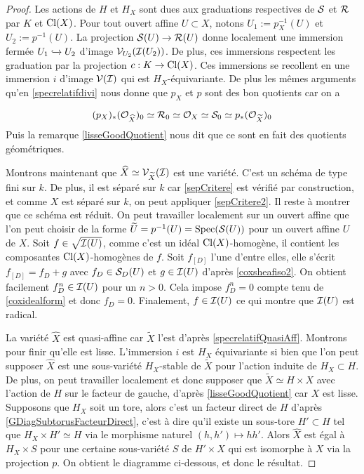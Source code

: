 \begin{proof}
Les actions de $H$ et $H_X$ sont dues aux graduations respectives de $\mathcal{S}$ et $\mathcal{R}$ par $K$ et $\operatorname{Cl}(X)$. Pour tout ouvert affine $U\subset X$, notons $U_1:=p_X^{-1}(U)$ et $U_2:=p^{-1}(U)$. La projection $\mathcal{S}(U)\rightarrow \mathcal{R}(U)$ donne localement une immersion fermée $U_1\xhookrightarrow{} U_2$ d'image $\mathcal{V}_{U_2}(\mathcal{I}(U_2))$. De plus, ces immersions respectent les graduation par la projection $c:K\rightarrow \operatorname{Cl}(X)$. Ces immersions se recollent en une immersion $i$ d'image $\mathcal{V}(\mathcal{I})$ qui est $H_X$-équivariante. De plus les mêmes arguments qu'en \ref{specrelatifdivi} nous donne que $p_X$ et $p$ sont des bon quotients car on a

$$(p_X)_*(\mathcal{O}_{\widehat{X}})_0\simeq \mathcal{R}_0\simeq\mathcal{O}_X\simeq\mathcal{S}_0\simeq  p_*(\mathcal{O}_{\widetilde{X}})_0$$
Puis la remarque \ref{lisseGoodQuotient} nous dit que ce sont en fait des quotients géométriques.

Montrons maintenant que $\widehat{X}\simeq \mathcal{V}_{\widetilde{X}}(\mathcal{I})$ est une variété. C'est un schéma de type fini sur $k$. De plus, il est séparé sur $k$ car \ref{sepCritere} est vérifié par construction, et comme $X$ est séparé sur $k$, on peut appliquer \ref{sepCritere2}. Il reste à montrer que ce schéma est réduit. On peut travailler localement sur un ouvert affine que l'on peut choisir de la forme $\widetilde{U}=p^{-1}(U)=\operatorname{Spec}(\mathcal{S}(U))$ pour un ouvert affine $U$ de $X$. Soit $f\in\sqrt{\mathcal{I}(U)}$, comme c'est un idéal $\operatorname{Cl}(X)$-homogène, il contient les composantes $\operatorname{Cl}(X)$-homogènes de $f$. Soit $f_{[D]}$ l'une d'entre elles, elle s'écrit $f_{[D]}=f_D+g$ avec $f_D\in \mathcal{S}_D(U)$ et $g\in\mathcal{I}(U)$ d'après \ref{coxsheafiso2}. On obtient facilement $f_D^n\in \mathcal{I}(U)$ pour un $n>0$. Cela impose $f_D^n=0$ compte tenu de \ref{coxidealform} et donc $f_D=0$. Finalement, $f\in\mathcal{I}(U)$ ce qui montre que $\mathcal{I}(U)$ est radical.

La variété $\widehat{X}$ est quasi-affine car $\widetilde{X}$ l'est d'après \ref{specrelatifQuasiAff}. Montrons pour finir qu'elle est lisse. L'immersion $i$ est $H_X$ équivariante si bien que l'on peut supposer $\widehat{X}$ est une sous-variété $H_X$-stable de $\widetilde{X}$ pour l'action induite de $H_X\subset H$. De plus, on peut travailler localement et donc supposer que $\widetilde{X}\simeq H\times X$ avec l'action de $H$ sur le facteur de gauche, d'après \ref{lisseGoodQuotient} car $X$ est lisse. Supposons que $H_X$ soit un tore, alors c'est un facteur direct de $H$ d'après \ref{GDiagSubtorusFacteurDirect}, c'est à dire qu'il existe un sous-tore $H'\subset H$ tel que $ H_X\times H'\simeq H$ via le morphisme naturel $(h,h')\mapsto hh'$. Alors $\widehat{X}$ est égal à $H_X\times S$ pour une certaine sous-variété $S$ de $H'\times X$ qui est isomorphe à $X$ via la projection $p$. On obtient le diagramme ci-dessous, et donc le résultat.


\end{proof}
